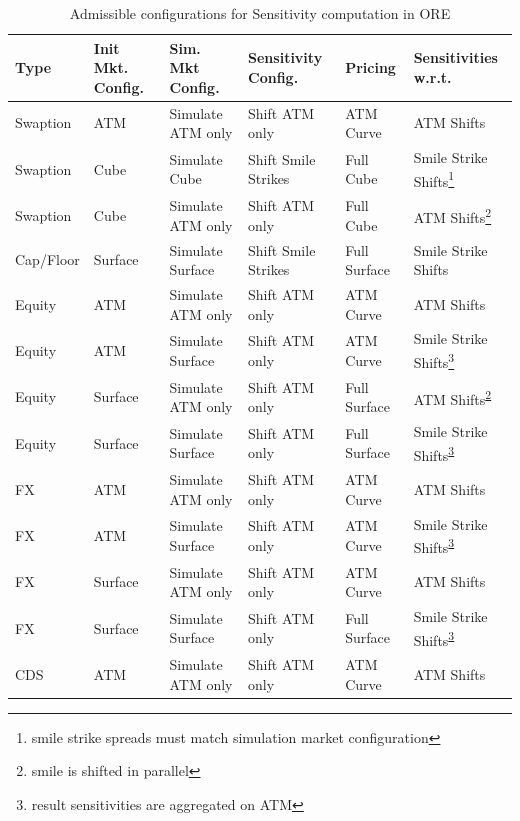 \documentclass[12pt, a4paper]{article}
\begin{document}
{\begin{appendix}
\begin{table}[hbt]
  \scriptsize
  \begin{center}
    \begin{tabular}{l | l | l | l | l | l}
      \hline
      Type & Init Mkt. Config. & Sim. Mkt Config. & Sensitivity Config. & Pricing & Sensitivities w.r.t. \\
      \hline
      Swaption & ATM & Simulate ATM only & Shift ATM only & ATM Curve & ATM Shifts \\
      Swaption & Cube & Simulate Cube & Shift Smile Strikes & Full Cube & Smile Strike Shifts\footnote{smile
                                                                          strike spreads must match simulation market configuration} \\
      Swaption & Cube & Simulate ATM only & Shift ATM only & Full Cube & ATM Shifts\footnote{smile is shifted in parallel\label{sensismileparallel}} \\
      \hline
      Cap/Floor & Surface & Simulate Surface & Shift Smile Strikes & Full Surface & Smile Strike Shifts \\
      \hline
      Equity & ATM & Simulate ATM only & Shift ATM only & ATM Curve & ATM Shifts \\
      Equity & ATM & Simulate Surface & Shift ATM only & ATM Curve & Smile Strike Shifts\footnote{result sensitivities
                                                                     are aggregated on ATM\label{sensiaggatm}} \\
      Equity & Surface & Simulate ATM only & Shift ATM only & Full Surface & ATM Shifts\textsuperscript{\ref{sensismileparallel}} \\
      Equity & Surface & Simulate Surface & Shift ATM only & Full Surface & Smile Strike Shifts\textsuperscript{\ref{sensiaggatm}} \\
      \hline
      FX & ATM & Simulate ATM only & Shift ATM only & ATM Curve & ATM Shifts \\
      FX & ATM & Simulate Surface & Shift ATM only & ATM Curve & Smile Strike Shifts\textsuperscript{\ref{sensiaggatm}} \\
      FX & Surface & Simulate ATM only & Shift ATM only & ATM Curve & ATM Shifts \\
      FX & Surface & Simulate Surface & Shift ATM only & Full Surface & Smile Strike Shifts\textsuperscript{\ref{sensiaggatm}} \\
      \hline
      CDS & ATM & Simulate ATM only & Shift ATM only & ATM Curve & ATM Shifts \\
    \end{tabular}
    \caption{Admissible configurations for Sensitivity computation in ORE}
    \label{sensi_config_overview}
  \end{center}
  \end{table}


\end{appendix}}
\end{document}
